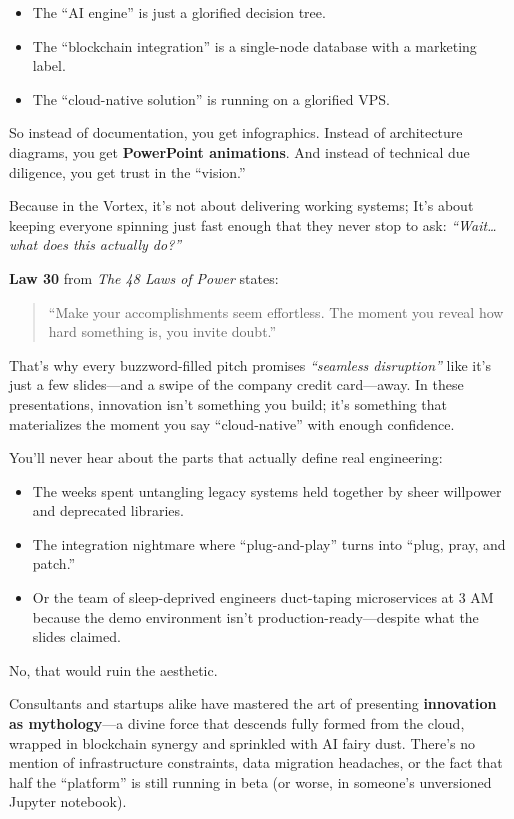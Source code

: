 \begin{itemize}
  \item The ``AI engine'' is just a glorified decision tree.
  \item The ``blockchain integration'' is a single-node database with a marketing label.
  \item The ``cloud-native solution'' is running on a glorified VPS.
\end{itemize}

So instead of documentation, you get infographics. Instead of architecture diagrams, you get \textbf{PowerPoint animations}.  And instead of technical due diligence, you get trust in the ``vision.''

Because in the Vortex, it's not about delivering working systems; It’s about keeping everyone spinning just fast enough that they never stop to ask: \textit{``Wait… what does this actually do?''}
  
  \textbf{Law 30} from \textit{The 48 Laws of Power} states:
  \begin{quote}
  ``Make your accomplishments seem effortless. The moment you reveal how hard something is, you invite doubt.''
  \end{quote}
  
  That’s why every buzzword-filled pitch promises \textit{``seamless disruption''} like it’s just a few slides—and a swipe of the company credit card—away. In these presentations, innovation isn’t something you build; it’s something that materializes the moment you say ``cloud-native'' with enough confidence.

  You’ll never hear about the parts that actually define real engineering:

  \begin{itemize}
    \item The weeks spent untangling legacy systems held together by sheer willpower and deprecated libraries.
    \item The integration nightmare where ``plug-and-play'' turns into ``plug, pray, and patch.''
    \item Or the team of sleep-deprived engineers duct-taping microservices at 3 AM because the demo environment isn't production-ready—despite what the slides claimed.
  \end{itemize}
  
  No, that would ruin the aesthetic.
  
  Consultants and startups alike have mastered the art of presenting \textbf{innovation as mythology}—a divine force that descends fully formed from the cloud, wrapped in blockchain synergy and sprinkled with AI fairy dust. There’s no mention of infrastructure constraints, data migration headaches, or the fact that half the ``platform'' is still running in beta (or worse, in someone’s unversioned Jupyter notebook).
  
